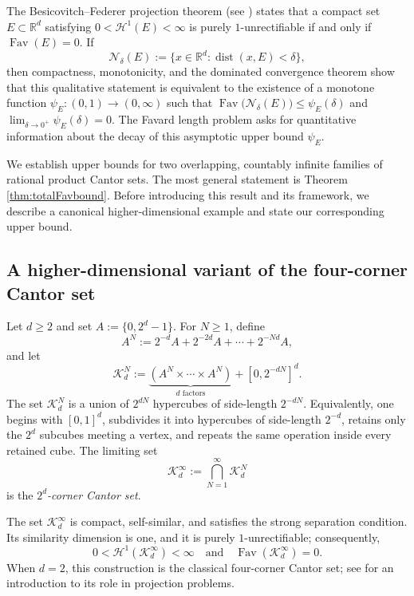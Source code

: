 \documentclass[12pt]{amsart}
\numberwithin{equation}{section}
\DeclareMathOperator{\Fav}{Fav}
\DeclareMathOperator{\dist}{dist}
\begin{document}
The Besicovitch--Federer projection theorem (see \cite[Theorem 18.1]{mattila}) states that a compact set $E\subset\mathbb{R}^d$ satisfying $0<\mathcal{H}^1(E)<\infty$ is purely $1$-unrectifiable if and only if $\Fav(E)=0$.  If
\[
\mathcal{N}_\delta(E):=\{x\in\mathbb{R}^d:\dist(x,E)<\delta\},
\]
then compactness, monotonicity, and the dominated convergence theorem show that this qualitative statement is equivalent to the existence of a monotone function $\psi_E:(0,1)\to(0,\infty)$ such that
$
\Fav\big(\mathcal{N}_\delta(E)\big)\leq \psi_E(\delta)
$
and
$
\lim_{\delta\to0^+}\psi_E(\delta)=0.
$
The Favard length problem asks for quantitative information about the decay of this asymptotic upper bound $\psi_E$.

We establish upper bounds for two overlapping, countably infinite families of rational product Cantor sets.  The most general statement is Theorem \ref{thm:totalFavbound}.  Before introducing this result and its framework, we describe a canonical higher-dimensional example and state our corresponding upper bound.

\subsection{A higher-dimensional variant of the four-corner Cantor set}
Let $d\geq2$ and set $A:=\{0,2^d-1\}$.  For $N\geq1$, define
\begin{equation}\label{eq:2dmultidigit}
A^N:=2^{-d}A+2^{-2d}A+\cdots+2^{-Nd}A,
\end{equation}
and let
\begin{equation}\label{eq:2diterates}
\mathcal{K}_d^N:=\underbrace{(A^N\times\cdots\times A^N)}_{d\text{ factors}}+[0,2^{-dN}]^d.
\end{equation}
The set $\mathcal{K}_d^N$ is a union of $2^{dN}$ hypercubes of side-length $2^{-dN}$.  Equivalently, one begins with $[0,1]^d$, subdivides it into hypercubes of side-length $2^{-d}$, retains only the $2^d$ subcubes meeting a vertex, and repeats the same operation inside every retained cube.  The limiting set
\begin{equation}\label{eq:2dcantorset}
\mathcal{K}_d^\infty:=\bigcap_{N=1}^\infty \mathcal{K}_d^N
\end{equation}
is the \emph{$2^d$-corner Cantor set}.

The set $\mathcal{K}_d^\infty$ is compact, self-similar, and satisfies the strong separation condition.  Its similarity dimension is one, and it is purely $1$-unrectifiable; consequently,
\[
0<\mathcal{H}^1(\mathcal{K}_d^\infty)<\infty
\quad\text{and}\quad
\Fav(\mathcal{K}_d^\infty)=0.
\]
When $d=2$, this construction is the classical four-corner Cantor set; see \cite{Tay} for an introduction to its role in projection problems.
\end{document}
